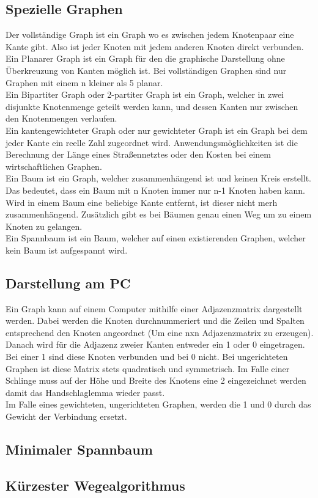 \documentclass{article}
\begin{document}
	\subsection{Spezielle Graphen}
	Der vollständige Graph ist ein Graph wo es zwischen jedem Knotenpaar eine Kante gibt. Also ist jeder Knoten mit jedem anderen Knoten direkt verbunden.\\
	Ein Planarer Graph ist ein Graph für den die graphische Darstellung ohne Überkreuzung von Kanten möglich ist. Bei vollständigen Graphen sind nur Graphen mit einem n kleiner als 5 planar. \\
	Ein Bipartiter Graph oder 2-partiter Graph ist ein Graph, welcher in zwei disjunkte Knotenmenge geteilt werden kann, und dessen Kanten nur zwischen den Knotenmengen verlaufen. \\
	Ein kantengewichteter Graph oder nur gewichteter Graph ist ein Graph bei dem jeder Kante ein reelle Zahl zugeordnet wird. Anwendungsmöglichkeiten ist die Berechnung der Länge eines Straßennetztes oder den Kosten bei einem wirtschaftlichen Graphen. \\
	Ein Baum ist ein Graph, welcher zusammenhängend ist und keinen Kreis erstellt. Das bedeutet, dass ein Baum mit n Knoten immer nur n-1 Knoten haben kann. Wird in einem Baum eine beliebige Kante entfernt, ist dieser nicht merh zusammenhängend. Zusätzlich gibt es bei Bäumen genau einen Weg um zu einem Knoten zu gelangen.  \\
	Ein Spannbaum ist ein Baum, welcher auf einen existierenden Graphen, welcher kein Baum ist aufgespannt wird.
	\subsection{Darstellung am PC}
	Ein Graph kann auf einem Computer mithilfe einer Adjazenzmatrix dargestellt werden. Dabei werden die Knoten durchnummeriert und die Zeilen und Spalten entsprechend den Knoten angeordnet (Um eine nxn Adjazenzmatrix zu erzeugen). Danach wird für die Adjazenz zweier Kanten entweder ein 1 oder 0 eingetragen. Bei einer 1 sind diese Knoten verbunden und bei 0 nicht. Bei ungerichteten Graphen ist diese Matrix stets quadratisch und symmetrisch. Im Falle einer Schlinge muss auf der Höhe und Breite des Knotens eine 2 eingezeichnet werden damit das Handschlaglemma wieder passt. \\
	Im Falle eines gewichteten, ungerichteten Graphen, werden die 1 und 0 durch das Gewicht der Verbindung ersetzt.
	\subsection{Minimaler Spannbaum}
	\subsection{Kürzester Wegealgorithmus}
	

	























  
\end{document}
